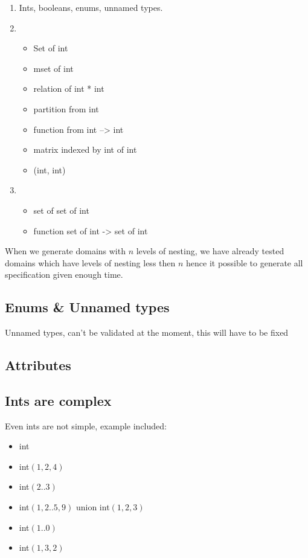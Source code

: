 \begin{enumerate}[start=0]
	\item Ints, booleans, enums, unnamed types.
	\item \begin{itemize}
		\item Set of int
		\item mset of int
		\item relation of int * int
		\item  partition from int
		\item function from int --> int
		\item matrix indexed by int of int
		\item (int, int)
		\end{itemize}
	\item \begin{itemize}
		\item  set of set of int
		\item  function set of int -> set of int 
	\end{itemize}
	
\end{enumerate}

When we generate domains with $n$ levels of nesting,  we have already tested domains which have levels of nesting less then $n$ hence it possible to generate all specification given enough time.


\subsection{Enums \& Unnamed types}

Unnamed types, can't be validated at the moment, this will  have to be fixed

\subsection{Attributes}

\subsection{Ints are complex}

Even ints are not simple, example included:

\begin{itemize}
	\item int
	\item int$(1,2,4)$
	\item int$(2..3)$
	\item int$(1,2..5,9)$ union int$(1,2,3)$
	\item int$(1..0)$
	\item int$(1,3,2)$
\end{itemize} 

